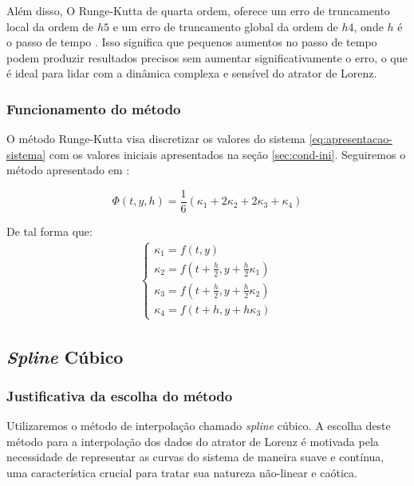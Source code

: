 \documentclass[12pt, a4paper]{article}
\begin{document}
    Além disso, O Runge-Kutta de quarta ordem, oferece um erro de
    truncamento local da ordem de $h5$ e um erro de truncamento global da ordem de
    $h4$, onde $h$ é o passo de tempo \cite{burden2016} \cite{roma2023}. Isso
    significa que pequenos aumentos no passo de tempo podem produzir resultados
    precisos sem aumentar significativamente o erro, o que é ideal para lidar com a
    dinâmica complexa e sensível do atrator de Lorenz.
    
    \subsubsection{Funcionamento do método}
    O método Runge-Kutta visa discretizar os valores do sistema
    \eqref{eq:apresentacao-sistema} com os valores iniciais apresentados na seção
    \ref{sec:cond-ini}. Seguiremos o método apresentado em \cite{roma2023}:
    
    \begin{equation}
        \Phi(t, y, h) = \frac{1}{6} (\kappa_1 + 2\kappa_2 + 2\kappa_3 +
        \kappa_4)
    \end{equation}
    
    De tal forma que:
    \begin{align}
        \begin{cases}
            \kappa_1 = f(t, y)         \\
            \kappa_2 = f\left(t + \frac{h}{2}, y +
            \frac{h}{2}\kappa_1\right) \\
            \kappa_3 = f\left(t + \frac{h}{2}, y +
            \frac{h}{2}\kappa_2\right) \\
            \kappa_4 = f(t + h, y + h\kappa_3)
        \end{cases}
    \end{align}
    
    \subsection{\textit{Spline} Cúbico}
    \subsubsection{Justificativa da escolha do método}
    Utilizaremos o método de interpolação chamado \textit{spline} cúbico. A
    escolha deste método para a interpolação dos dados do atrator de Lorenz é
    motivada pela necessidade de representar as curvas do sistema de maneira suave
    e contínua, uma característica crucial para tratar sua natureza não-linear e
    caótica.
    
\end{document}
